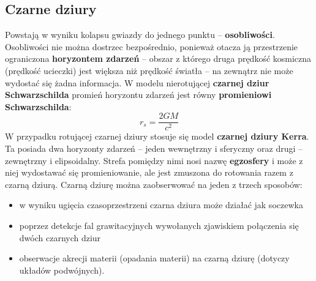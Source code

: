 \documentclass[../index.tex]{subfiles}
\begin{document}
        \subsection{Czarne dziury}
            Powstają w wyniku kolapsu gwiazdy do jednego punktu – \textbf{osobliwości}. Osobliwości nie można dostrzec bezpośrednio, ponieważ otacza ją przestrzenie ograniczona \textbf{horyzontem zdarzeń} – obszar z którego druga prędkość kosmiczna (prędkość ucieczki) jest większa niż prędkość światła – na zewnątrz nie może wydostać się żadna informacja. W modelu nierotującej \textbf{czarnej dziur Schwarzschilda} promień horyzontu zdarzeń jest równy \textbf{promieniowi Schwarzschilda}:
            \begin{equation}
                r_s = \frac{2 G M}{c^2 } 
            \end{equation}
            W przypadku rotującej czarnej dziury stosuje się model \textbf{czarnej dziury Kerra}. Ta posiada dwa horyzonty zdarzeń – jeden wewnętrzny i sferyczny oraz drugi – zewnętrzny i elipsoidalny. Strefa pomiędzy nimi nosi nazwę \textbf{egzosfery} i może z niej wydostawać się promieniowanie, ale jest zmuszona do rotowania razem z czarną dziurą. Czarną dziurę można zaobserwować na jeden z trzech sposobów:
            \begin{itemize}
                \item w wyniku ugięcia czasoprzestrzeni czarna dziura może działać jak soczewka 
                \item poprzez detekcje fal grawitacyjnych wywołanych zjawiskiem połączenia się dwóch czarnych dziur
                \item obserwacje akrecji materii (opadania materii) na czarną dziurę (dotyczy układów podwójnych).
            \end{itemize}
\end{document}

